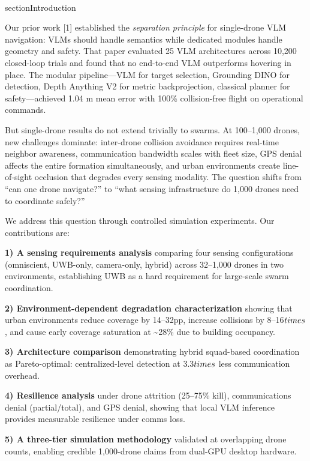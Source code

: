 \documentclass[conference]{IEEEtran}
\begin{document}
\\section{Introduction}\label{i.-introduction}

Our prior work [1] established the \emph{separation principle} for
single-drone VLM navigation: VLMs should handle semantics while
dedicated modules handle geometry and safety. That paper evaluated 25
VLM architectures across 10,200 closed-loop trials and found that no
end-to-end VLM outperforms hovering in place. The modular pipeline---VLM
for target selection, Grounding DINO for detection, Depth Anything V2
for metric backprojection, classical planner for safety---achieved 1.04
m mean error with 100\% collision-free flight on operational commands.

But single-drone results do not extend trivially to swarms. At
100--1,000 drones, new challenges dominate: inter-drone collision
avoidance requires real-time neighbor awareness, communication bandwidth
scales with fleet size, GPS denial affects the entire formation
simultaneously, and urban environments create line-of-sight occlusion
that degrades every sensing modality. The question shifts from ``can one
drone navigate?'' to ``what sensing infrastructure do 1,000 drones need
to coordinate safely?''

We address this question through controlled simulation experiments. Our
contributions are:

\textbf{1) A sensing requirements analysis} comparing four sensing
configurations (omniscient, UWB-only, camera-only, hybrid) across
32--1,000 drones in two environments, establishing UWB as a hard
requirement for large-scale swarm coordination.

\textbf{2) Environment-dependent degradation characterization} showing
that urban environments reduce coverage by 14--32pp, increase collisions
by 8--16$\\times$, and cause early coverage saturation at \textasciitilde28\%
due to building occupancy.

\textbf{3) Architecture comparison} demonstrating hybrid squad-based
coordination as Pareto-optimal: centralized-level detection at 3.3$\\times$ less
communication overhead.

\textbf{4) Resilience analysis} under drone attrition (25--75\% kill),
communications denial (partial/total), and GPS denial, showing that
local VLM inference provides measurable resilience under comms loss.

\textbf{5) A three-tier simulation methodology} validated at overlapping
drone counts, enabling credible 1,000-drone claims from dual-GPU desktop
hardware.
\end{document}
